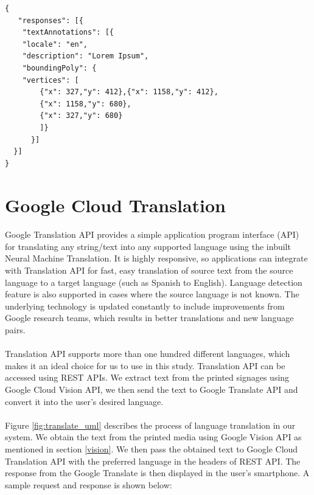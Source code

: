 \documentclass[12pt]{article}
\begin{document}
\begin{lstlisting}
{
   "responses": [{
	"textAnnotations": [{
	"locale": "en",
	"description": "Lorem Ipsum",
	"boundingPoly": {
	"vertices": [
		{"x": 327,"y": 412},{"x": 1158,"y": 412},
		{"x": 1158,"y": 680},
		{"x": 327,"y": 680}
		]}
	  }]
  }]
}
\end{lstlisting}


\section{Google Cloud Translation}
\label{translate}

\paragraph{}Google Translation API provides a simple application program interface (API) for translating any string/text into any supported language using the inbuilt Neural Machine Translation. It is highly responsive, so applications can integrate with Translation API for fast, easy translation of source text from the source language to a target language (such as Spanish to English). Language detection feature is also supported in cases where the source language is not known. The underlying technology is updated constantly to include improvements from Google research teams, which results in better translations and new language pairs.

\paragraph{}Translation API supports more than one hundred different languages, which makes it an ideal choice for us to use in this study. Translation API can be accessed using REST APIs. We extract text from the printed signages using Google Cloud Vision API, we then send the text to Google Translate API and convert it into the user's desired language.

\paragraph{}Figure \ref{fig:translate_uml} describes the process of language translation in our system. We obtain the text from the printed media using Google Vision API as mentioned in section \ref{vision}. We then pass the obtained text to Google Cloud Translation API with the preferred language in the headers of REST API. The response from the Google Translate is then displayed in the user's smartphone. A sample request and response is shown below:
\end{document}
